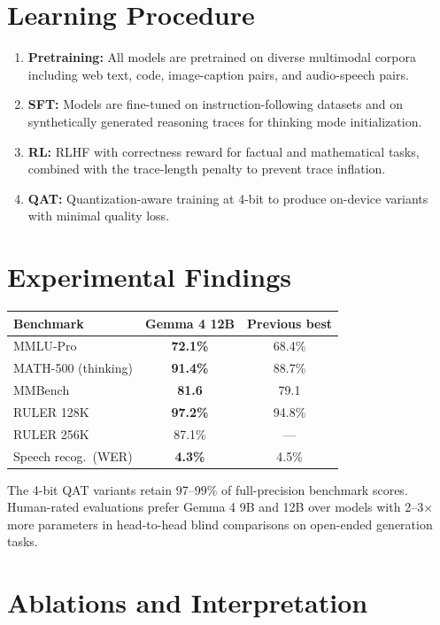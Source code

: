 \documentclass[10pt,twocolumn]{article}
\begin{document}
\section{Learning Procedure}

\begin{enumerate}[itemsep=2pt,parsep=0pt]
  \item \textbf{Pretraining:} All models are pretrained on diverse
    multimodal corpora including web text, code, image-caption pairs,
    and audio-speech pairs.
  \item \textbf{SFT:} Models are fine-tuned on instruction-following
    datasets and on synthetically generated reasoning traces for
    thinking mode initialization.
  \item \textbf{RL:} RLHF with correctness reward for factual and
    mathematical tasks, combined with the trace-length penalty to
    prevent trace inflation.
  \item \textbf{QAT:} Quantization-aware training at 4-bit to
    produce on-device variants with minimal quality loss.
\end{enumerate}

\section{Experimental Findings}

\begin{center}
\small
\begin{tabular}{lcc}
\toprule
Benchmark & Gemma 4 12B & Previous best \\
\midrule
MMLU-Pro & \textbf{72.1\%} & 68.4\% \\
MATH-500 (thinking) & \textbf{91.4\%} & 88.7\% \\
MMBench & \textbf{81.6} & 79.1 \\
RULER 128K & \textbf{97.2\%} & 94.8\% \\
RULER 256K & 87.1\% & --- \\
Speech recog.\ (WER) & \textbf{4.3\%} & 4.5\% \\
\bottomrule
\end{tabular}
\end{center}

The 4-bit QAT variants retain 97--99\% of full-precision benchmark
scores.
Human-rated evaluations prefer Gemma 4 9B and 12B over models with
2--3$\times$ more parameters in head-to-head blind comparisons
on open-ended generation tasks.

\section{Ablations and Interpretation}
\end{document}
